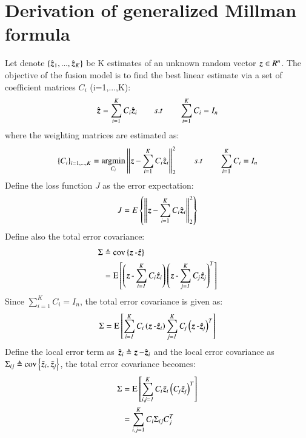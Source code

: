 \section{Derivation of generalized Millman formula}
\label{apx_BayesGausvars_2}
Let denote $ \left\lbrace \hat{\operatorname{\boldsymbol{z}}}_1,...,\hat{\operatorname{\boldsymbol{z}}}_K \right\rbrace  $ be K estimates of an unknown random vector $ \operatorname{\boldsymbol{z}} \in R^n $. The objective of the fusion model is to find the best linear estimate via a set of coefficient matrices $ C_i $ (i=1,...,K):
\begin{equation}
\hat{\operatorname{\boldsymbol{z}}}=\sum\limits_{i=1}^{K}{C_i\hat{\operatorname{\boldsymbol{z}}}_i} \:\:\:\:\:\:\:\:\: s.t \:\:\:\:\:\:\:\:\: \sum\limits_{i=1}^{K}{C_i}=I_n
\end{equation}
where the weighting matrices are estimated as:
\begin{equation}
\left\lbrace C_i \right\rbrace_{i=1,...,K}=\operatorname*{\arg\!\min}_{C_i} \left\| \operatorname{\boldsymbol{z}}-\sum_{i=1}^{K}{C_i\hat{\operatorname{\boldsymbol{z}}}_i} \right\|^2_2 \:\:\:\:\:\:\:\:\: s.t \:\:\:\:\:\:\:\:\: \sum_{i=1}^{K}{C_i}=I_n
\end{equation}
Define the loss function $ J $ as the error expectation:
\begin{equation}
J=E\left\lbrace \left\|  \operatorname{\boldsymbol{z}}-\sum\limits_{i=1}^{K}{C_i\hat{\operatorname{\boldsymbol{z}}}_i} \right\| ^2_2 \right\rbrace 
\end{equation}
Define also the total error covariance:
\begin{align}
	\Sigma &\triangleq \operatorname{cov \left\lbrace \mathit{ \operatorname{\boldsymbol{z}}-\hat{\operatorname{\boldsymbol{z}}}} \right\rbrace }  \\ 
	&= \operatorname{E \left[ \mathit{\left(   \operatorname{\boldsymbol{z}}-\sum\limits_{i=1}^{K}{C_i\hat{\operatorname{\boldsymbol{z}}}_i} \right) \left(   \operatorname{\boldsymbol{z}}-\sum\limits_{j=1}^{K}{C_j\hat{\operatorname{\boldsymbol{z}}}_j} \right)^T} \right] }
\end{align}
Since $ \sum_{i=1}^{K}{C_i}=I_n $, the total error covariance is given as:
\begin{equation}
	\Sigma = \operatorname{E \left[ \mathit{ \sum\limits_{i=1}^{K}{C_i\left(\operatorname{\boldsymbol{z}}-\hat{\operatorname{\boldsymbol{z}}}_i \right)}  \sum\limits_{j=1}^{K}{C_j\left(\operatorname{\boldsymbol{z}}-\hat{\operatorname{\boldsymbol{z}}}_j\right)^T}} \right] }
\end{equation}
Define the local error term as $ \tilde{\operatorname{\boldsymbol{z}}}_i \triangleq \operatorname{\boldsymbol{z}}-\hat{\operatorname{\boldsymbol{z}}}_i $ and the local error covariance as $ \Sigma_{ij}\triangleq \operatorname{cov \left\lbrace \mathit{\tilde{\operatorname{\boldsymbol{z}}}_i,\tilde{\operatorname{\boldsymbol{z}}}_j} \right\rbrace } $, the total error covariance becomes:
\begin{align}
	\Sigma &= \operatorname{E \left[ \mathit{\sum\limits_{i,j=1}^{K}{C_i\tilde{\operatorname{\boldsymbol{z}}}_i \left(C_j\tilde{\operatorname{\boldsymbol{z}}}_j\right)^T}} \right] } \\
	&= \sum\limits_{i,j=1}^{K}{C_i\Sigma_{ij}C_j^T}
\end{align}
